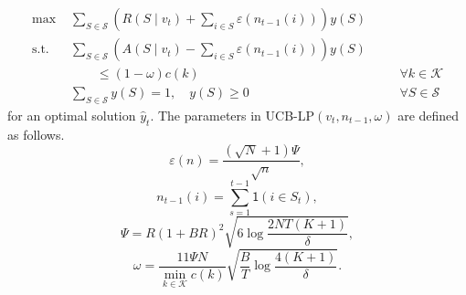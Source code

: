 \documentclass{article}
\theoremstyle{definition}
\newcommand{\KKK}{\mathcal{K}}
\newcommand{\SSS}{\mathcal{S}}
\begin{document}
\begin{subequations}\label{LP:MNL_UCB}
\begin{alignat}{3}
\text{max }    &\sum_{S\in \SSS} \left(R(S\mid v_t) + \sum_{i\in S} \varepsilon(n_{t-1}(i))\right)y(S) \nonumber\\
\text{s.t. }   &\sum_{S\in \SSS} \left(A( S\mid v_t) - \sum_{i\in S} \varepsilon(n_{t-1}(i))\right)y(S) & & \nonumber\\
& \qquad \leq (1-\omega)c(k)       &\quad &\forall k \in \KKK \label{eq:UCB.1}\\
&\sum_{S\in \SSS}y(S) = 1, \quad y(S)\geq   0 &\quad & \forall S\in \SSS\label{eq:UCB.3}
\end{alignat}
\end{subequations}
for an optimal solution $\hat{y}_t$. The parameters in UCB-LP$(v_t, n_{t-1}, \omega)$ are defined as follows.
\begin{equation}\label{eq:epsilon}
\varepsilon(n) = \frac{(\sqrt{N} + 1)\Psi}{\sqrt{n}},
\end{equation}
\begin{equation}\label{eq:nt}
n_{t-1}(i) = \sum^{t-1}_{s = 1}\mathsf{1}(i\in S_t),
\end{equation}
\begin{equation}\label{eq:Psi}
\Psi = R(1 + B R)^2\sqrt{6\log{\frac{2NT(K+1)}{\delta}}},
\end{equation}
\begin{equation}\label{eq:omega}
\omega = \frac{11\Psi N}{\min_{k\in \KKK}c(k)}\sqrt{\frac{B}{T}\log\frac{4(K+1)}{\delta}}.
\end{equation}


\iffalse
\begin{minipage}{.35\linewidth} 
  \begin{align}
  \varepsilon(n) &= \frac{(\sqrt{N} + 1)\Psi}{\sqrt{n}},\label{eq:epsilon} \\
n_{t-1}(i) &= \sum^{t-1}_{s = 1}\mathsf{1}(i\in S_t),\label{eq:nt}
\end{align}
\end{minipage}
\begin{minipage}{.65\linewidth} 
\begin{align}
\Psi &= e^R(1 + B e^{R})^2\sqrt{6\log{\frac{2NT(K+1)}{\delta}}},\label{eq:Psi}\\
\omega &= \frac{11\Psi N}{\min_{k\in \KKK}c(k)}\sqrt{\frac{B}{T}\log\frac{4(K+1)}{\delta}}.\label{eq:omega}
\end{align}
\end{minipage}
\fi
\end{document}
